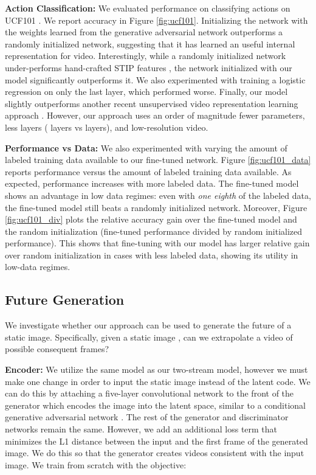 \documentclass{article}
\begin{document}
\textbf{Action Classification:} We evaluated performance on classifying actions on UCF101 \cite{soomro2012ucf101}. We report accuracy in Figure \ref{fig:ucf101}. Initializing the network with the weights learned from the generative adversarial network outperforms a randomly initialized network, suggesting that it has learned an useful internal representation for video. Interestingly, while a randomly initialized network under-performs hand-crafted STIP features \cite{soomro2012ucf101}, the network initialized with our model significantly outperforms it. We also experimented with training a logistic regression on only the last layer, which performed worse. Finally, our model slightly outperforms another recent unsupervised video representation learning approach \cite{misra2016unsupervised}. However, our approach uses an order of magnitude fewer parameters, less layers ( layers vs  layers), and low-resolution video. 


\textbf{Performance vs Data:} We also experimented with varying the amount of labeled training data available to our fine-tuned network. Figure \ref{fig:ucf101_data} reports performance versus the amount of labeled training data available. As expected, performance increases with more labeled data. The fine-tuned model shows an advantage in low data regimes: even with \emph{one eighth} of the labeled data, the fine-tuned model still beats a randomly initialized network. 
Moreover, Figure \ref{fig:ucf101_div} plots the relative accuracy gain over the fine-tuned model and the random initialization (fine-tuned performance divided by random initialized performance). This shows that fine-tuning with our model has larger relative gain over random initialization in cases with less labeled data, showing its utility in low-data regimes. 


\subsection{Future Generation} 

We investigate whether our approach can be used to generate the future of a static image. Specifically, given a static image , can we extrapolate a video of possible consequent frames?

\textbf{Encoder:} We utilize the same model as our two-stream model, however we must make one change in order to input the static image instead of the latent code. We can do this by attaching a five-layer convolutional network to the front of the generator which encodes the image into the latent space, similar to a conditional generative adversarial network \cite{mirza2014conditional}. The rest of the generator and discriminator networks remain the same. However, we add an additional loss term that minimizes the L1 distance between the input and the first frame of the generated image. We do this so that the generator creates videos consistent with the input image. We train from scratch with the objective:
\end{document}
